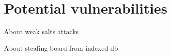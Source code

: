 \section{Potential vulnerabilities}
\label{sec:potential_vulnerabilities}

About weak salts attacks

About stealing board from indexed db

